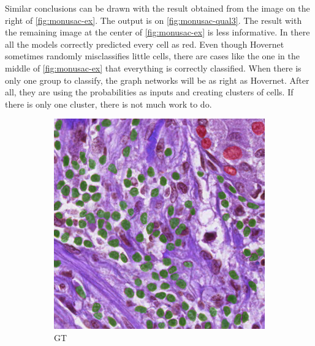 Similar conclusions can be drawn with the result obtained from the image on the right of \autoref{fig:monusac-ex}. The output is on \autoref{fig:monusac-qual3}. The result with the remaining image at the center of \autoref{fig:monusac-ex} is less informative. In there all the models correctly predicted every cell as red. Even though Hovernet sometimes randomly misclassifies little cells, there are cases like the one in the middle of \autoref{fig:monusac-ex} that everything is correctly classified. When there is only one group to classify, the graph networks will be as right as Hovernet. After all, they are using the probabilities as inputs and creating clusters of cells. If there is only one cluster, there is not much work to do.

\begin{figure}[H]
  \centering
  \begin{subfigure}[b]{0.45\textwidth}
    \includegraphics[width=\textwidth]{imgs/qual/monusac/gt1.overlay.png}
    \caption{GT}
    \label{fig:monusac-gt1}
  \end{subfigure}
  \hfill
  \begin{subfigure}[b]{0.45\textwidth}

\end{subfigure}
\end{figure}
